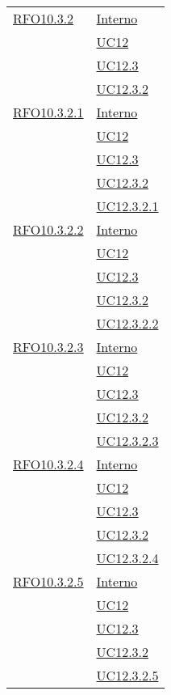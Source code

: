 \begin{longtable}{|>{\centering}m{5cm}|m{5cm}<{\centering}|}
 \hyperlink{RFO10.3.2}{RFO10.3.2} 
& \hyperlink{Interno}{Interno}\\
& \hyperref[UC12]{UC12}\\
& \hyperref[UC12.3]{UC12.3}\\
& \hyperref[UC12.3.2]{UC12.3.2}\\\hline

 \hyperlink{RFO10.3.2.1}{RFO10.3.2.1} 
& \hyperlink{Interno}{Interno}\\
& \hyperref[UC12]{UC12}\\
& \hyperref[UC12.3]{UC12.3}\\
& \hyperref[UC12.3.2]{UC12.3.2}\\
& \hyperref[UC12.3.2.1]{UC12.3.2.1}\\\hline

 \hyperlink{RFO10.3.2.2}{RFO10.3.2.2} 
& \hyperlink{Interno}{Interno}\\
& \hyperref[UC12]{UC12}\\
& \hyperref[UC12.3]{UC12.3}\\
& \hyperref[UC12.3.2]{UC12.3.2}\\
& \hyperref[UC12.3.2.2]{UC12.3.2.2}\\\hline

 \hyperlink{RFO10.3.2.3}{RFO10.3.2.3} 
& \hyperlink{Interno}{Interno}\\
& \hyperref[UC12]{UC12}\\
& \hyperref[UC12.3]{UC12.3}\\
& \hyperref[UC12.3.2]{UC12.3.2}\\
& \hyperref[UC12.3.2.1]{UC12.3.2.3}\\\hline

 \hyperlink{RFO10.3.2.4}{RFO10.3.2.4} 
& \hyperlink{Interno}{Interno}\\
& \hyperref[UC12]{UC12}\\
& \hyperref[UC12.3]{UC12.3}\\
& \hyperref[UC12.3.2]{UC12.3.2}\\
& \hyperref[UC12.3.2.4]{UC12.3.2.4}\\\hline

 \hyperlink{RFO10.3.2.5}{RFO10.3.2.5} 
& \hyperlink{Interno}{Interno}\\
& \hyperref[UC12]{UC12}\\
& \hyperref[UC12.3]{UC12.3}\\
& \hyperref[UC12.3.2]{UC12.3.2}\\
& \hyperref[UC12.3.2.5]{UC12.3.2.5}\\\hline


\end{longtable}
